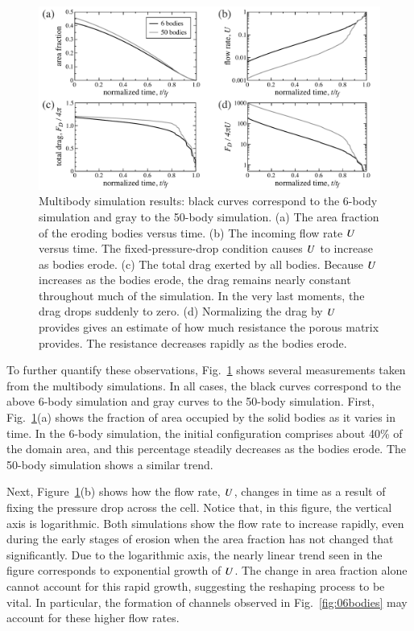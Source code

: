 \documentclass[preprint, 10pt]{elsarticle}
\begin{document}
\begin{figure}%
\begin{center}
\includegraphics[width = 0.90 \textwidth]{./figs/mbodyplots.pdf}
\caption{\label{fig:mbodyplots} 
Multibody simulation results: black curves correspond to the 6-body simulation and gray to the 50-body simulation. (a) The area fraction of the eroding bodies versus time. (b) The incoming flow rate $U$ versus time. The fixed-pressure-drop condition causes $U$ to increase as bodies erode. (c) The total drag exerted by all bodies. Because $U$ increases as the bodies erode, the drag remains nearly constant throughout much of the simulation. In the very last moments, the drag drops suddenly to zero. (d) Normalizing the drag by $U$ provides gives an estimate of how much resistance the porous matrix provides. The resistance decreases rapidly as the bodies erode.
}
\end{center}
\end{figure}

To further quantify these observations, Fig.~\ref{fig:mbodyplots} shows several measurements taken from the multibody simulations. In all cases, the black curves correspond to the above 6-body simulation and gray curves to the 50-body simulation. First, Fig.~\ref{fig:mbodyplots}(a) shows the fraction of area occupied by the solid bodies as it varies in time. In the 6-body simulation, the initial configuration comprises about 40\% of the domain area, and this percentage steadily decreases as the bodies erode. The 50-body simulation shows a similar trend. 

Next, Figure~\ref{fig:mbodyplots}(b) shows how the flow rate, $U$, changes in time as a result of fixing the pressure drop across the cell. Notice that, in this figure, the vertical axis is logarithmic. Both simulations show the flow rate to increase rapidly, even during the early stages of erosion when the area fraction has not changed that significantly. Due to the logarithmic axis, the nearly linear trend seen in the figure corresponds to exponential growth of $U$. The change in area fraction alone cannot account for this rapid growth, suggesting the reshaping process to be vital. In particular, the formation of channels observed in Fig.~\ref{fig:06bodies} may account for these higher flow rates.
\end{document}
